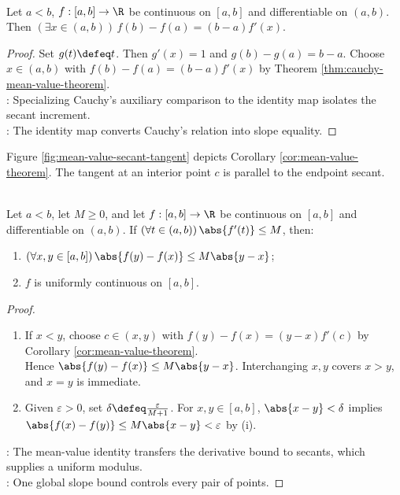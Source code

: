 \begin{corollary} \label{cor:mean-value-theorem} \\
Let $a<b$, $f:[a,b]\to\R$ be continuous on $[a,b]$ and differentiable on $(a,b)$. Then $(\exists x\in(a,b))\,f(b)-f(a)=(b-a)f'(x)$.
\begin{proof}
Set $g(t)\defeq t$. Then $g'(x)=1$ and $g(b)-g(a)=b-a$. Choose $x\in(a,b)$ with $f(b)-f(a)=(b-a)f'(x)$ by Theorem \ref{thm:cauchy-mean-value-theorem}.\\
: Specializing Cauchy's auxiliary comparison to the identity map isolates the secant increment.\\
: The identity map converts Cauchy's relation into slope equality.
\end{proof}
\end{corollary}

\noindent Figure \ref{fig:mean-value-secant-tangent} depicts Corollary \ref{cor:mean-value-theorem}. The tangent at an interior point $c$ is parallel to the endpoint secant.

\begin{illustrationfigure}[H]
  \centering
  
  \caption{The Mean Value Theorem finds an interior tangent slope equal to the endpoint secant slope.}
  \label{fig:mean-value-secant-tangent}
\end{illustrationfigure}

\begin{corollary} \label{cor:bounded-derivative-lipschitz-one-variable} \\
Let $a<b$, let $M\geq0$, and let $f:[a,b]\to\R$ be continuous on $[a,b]$ and differentiable on $(a,b)$. If $(\forall t\in(a,b))\,\abs{f'(t)}\leq M$, then:
\begin{enumerate}[label=(\roman*)]
\setlength{\itemsep}{0pt}
\item $(\forall x,y\in[a,b])\,\abs{f(y)-f(x)}\leq M\abs{y-x}$;
\item $f$ is uniformly continuous on $[a,b]$.
\end{enumerate}
\begin{proof}
\begin{enumerate}[label=(\roman*)]
\setlength{\itemsep}{0pt}
\item If $x<y$, choose $c\in(x,y)$ with $f(y)-f(x)=(y-x)f'(c)$ by Corollary \ref{cor:mean-value-theorem}.\\
Hence $\abs{f(y)-f(x)}\leq M\abs{y-x}$. Interchanging $x,y$ covers $x>y$, and $x=y$ is immediate.
\item Given $\varepsilon>0$, set $\delta\defeq\frac{\varepsilon}{M+1}$. For $x,y\in[a,b]$, $\abs{x-y}<\delta$ implies $\abs{f(x)-f(y)}\leq M\abs{x-y}<\varepsilon$ by (i).
\end{enumerate}
: The mean-value identity transfers the derivative bound to secants, which supplies a uniform modulus.\\
: One global slope bound controls every pair of points.
\end{proof}
\end{corollary}

